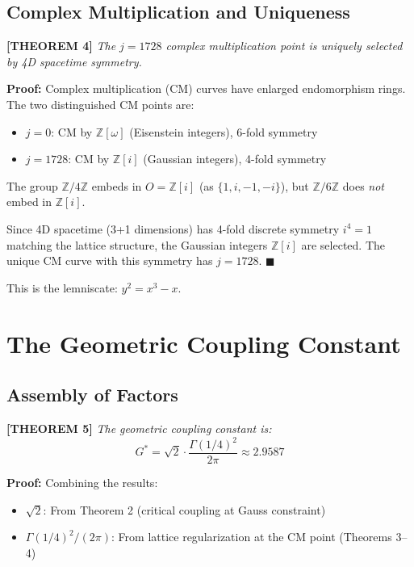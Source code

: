 \documentclass[aps,prd,twocolumn,10pt,groupedaddress,superscriptaddress]{revtex4-2}
\begin{document}
\subsection{Complex Multiplication and Uniqueness}

\textbf{[THEOREM 4]} \textit{The $j = 1728$ complex multiplication point is uniquely selected by 4D spacetime symmetry.}

\textbf{Proof:} Complex multiplication (CM) curves have enlarged endomorphism rings. The two distinguished CM points are:
\begin{itemize}
\item $j = 0$: CM by $\mathbb{Z}[\omega]$ (Eisenstein integers), 6-fold symmetry
\item $j = 1728$: CM by $\mathbb{Z}[i]$ (Gaussian integers), 4-fold symmetry
\end{itemize}

The group $\mathbb{Z}/4\mathbb{Z}$ embeds in $O = \mathbb{Z}[i]$ (as $\{1, i, -1, -i\}$), but $\mathbb{Z}/6\mathbb{Z}$ does \textit{not} embed in $\mathbb{Z}[i]$.

Since 4D spacetime (3+1 dimensions) has 4-fold discrete symmetry $i^4 = 1$ matching the lattice structure, the Gaussian integers $\mathbb{Z}[i]$ are selected. The unique CM curve with this symmetry has $j = 1728$. $\blacksquare$

This is the lemniscate: $y^2 = x^3 - x$.

\section{The Geometric Coupling Constant}

\subsection{Assembly of Factors}

\textbf{[THEOREM 5]} \textit{The geometric coupling constant is:}
\begin{equation}
G^* = \sqrt{2} \cdot \frac{\Gamma(1/4)^2}{2\pi} \approx 2.9587
\end{equation}

\textbf{Proof:} Combining the results:
\begin{itemize}
\item $\sqrt{2}$: From Theorem 2 (critical coupling at Gauss constraint)
\item $\Gamma(1/4)^2/(2\pi)$: From lattice regularization at the CM point (Theorems 3--4)
\end{itemize}
\end{document}
